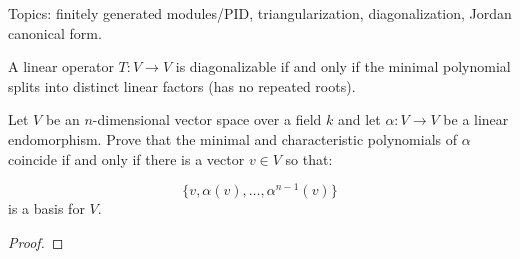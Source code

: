 Topics: finitely generated modules/PID, triangularization, diagonalization, Jordan canonical form.


\begin{prop}
    A linear operator $T:V\to V$ is diagonalizable if and only if the minimal polynomial splits into distinct linear factors (has no repeated roots).
\end{prop}


\begin{prob}[F2018-Q1]
    Let \( V \) be an \( n \)-dimensional vector space over a field \( k \) and let \( \alpha: V \to V \) be a linear endomorphism.  
Prove that the minimal and characteristic polynomials of \( \alpha \) coincide if and only if there is a vector \( v \in V \) so that:  

\[\{v, \alpha(v), \ldots, \alpha^{n-1}(v)\}\]
is a basis for \( V \).
\end{prob}
\begin{proof}
\end{proof}


